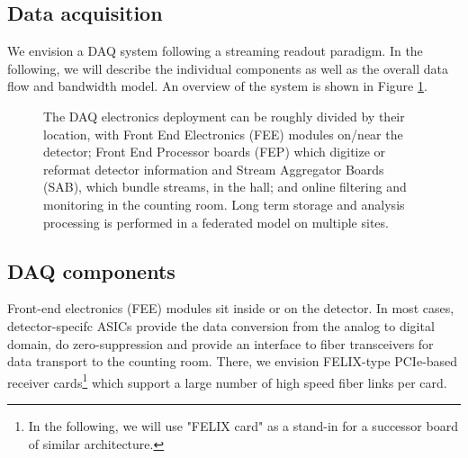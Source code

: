 \label{sec:online}

\subsection{Data acquisition}

We envision a DAQ system following a streaming readout paradigm. In the following, we will describe the individual components as well as the overall data flow and bandwidth model. An overview of the system is shown in Figure \ref{fig:data_acquisition_diagram}.


\begin{figure}[hbt!]
 \begin{center}
  
  
  \caption[Data Acquisition Diagram]{\label{fig:data_acquisition_diagram} The DAQ electronics deployment can be roughly divided by their location, with Front End Electronics (FEE) modules on/near the detector; Front End Processor boards (FEP) which digitize or reformat detector information and Stream Aggregator Boards (SAB), which bundle streams, in the hall; and online filtering and monitoring in the counting room. Long term storage and analysis processing is performed in a federated model on multiple sites. }
 \end{center}
\end{figure}


\subsection{DAQ components}
 Front-end electronics (FEE) modules sit inside or on the detector. In most cases, detector-specifc ASICs provide the data conversion from the analog to digital domain, do zero-suppression and provide an interface to fiber transceivers for data transport to the counting room.  There, we envision FELIX-type PCIe-based receiver cards\footnote{In the following, we will use "FELIX card" as a stand-in for a successor board of similar architecture.} which support a large number of high speed fiber links per card.  

